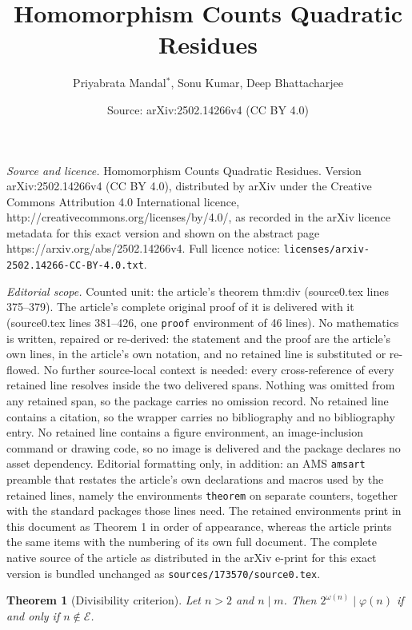 \documentclass[10pt,a4paper]{amsart}
\title{Homomorphism Counts Quadratic Residues}
\author{Priyabrata Mandal$^*$, Sonu Kumar, Deep Bhattacharjee}
\date{Source: arXiv:2502.14266v4 (CC BY 4.0)}
\newtheorem{theorem}{Theorem}
\newcommand{\Exc}{\mathcal{E}}
\renewcommand{\phi}{\varphi}
\begin{document}
\maketitle

\noindent\emph{Source and licence.} Homomorphism Counts Quadratic Residues. Version arXiv:2502.14266v4 (CC BY 4.0), distributed by arXiv under the Creative Commons Attribution 4.0 International licence, http://creativecommons.org/licenses/by/4.0/, as recorded in the arXiv licence metadata for this exact version and shown on the abstract page https://arxiv.org/abs/2502.14266v4. Full licence notice: \texttt{licenses/arxiv-2502.14266-CC-BY-4.0.txt}.\par\smallskip

\noindent\textit{Editorial scope.} Counted unit: the article's theorem thm:div (source0.tex lines 375--379). The article's complete original proof of it is delivered with it (source0.tex lines 381--426, one \texttt{proof} environment of 46 lines). No mathematics is written, repaired or re-derived: the statement and the proof are the article's own lines, in the article's own notation, and no retained line is substituted or re-flowed.  No further source-local context is needed: every cross-reference of every retained line resolves inside the two delivered spans.  Nothing was omitted from any retained span, so the package carries no omission record.  No retained line contains a citation, so the wrapper carries no bibliography and no bibliography entry.  No retained line contains a figure environment, an image-inclusion command or drawing code, so no image is delivered and the package declares no asset dependency.  Editorial formatting only, in addition: an AMS \texttt{amsart} preamble that restates the article's own declarations and macros used by the retained lines, namely the environments \texttt{theorem} on separate counters, together with the standard packages those lines need.  The retained environments print in this document as Theorem 1 in order of appearance, whereas the article prints the same items with the numbering of its own full document.  The complete native source of the article as distributed in the arXiv e-print for this exact version is bundled unchanged as \texttt{sources/173570/source0.tex}.
\begin{theorem}[Divisibility criterion]\label{thm:div}
  Let $n>2$ and $n\mid m$.  Then
  $2^{\omega(n)}\mid\phi(n)$
  if and only if $n\notin\Exc$.
\end{theorem}
\end{document}
